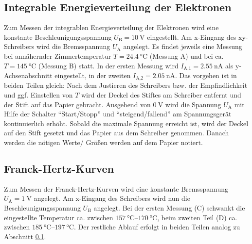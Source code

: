 \subsection{Integrable Energieverteilung der Elektronen}
\label{sec:enegieverteilung}
Zum Messen der integrablen Energieverteilung der Elektronen wird eine konstante Beschleunigungsspannung $U_\text{B} = \qty[]{10}{\volt}$ eingestellt.
Am x-Eingang des xy-Schreibers wird die Bremsspannung $U_\text{A}$ angelegt.
Es findet jeweils eine Messung bei annähernder Zimmertemperatur $T = \qty[]{24.4}{\celsius}$ (Messung A) und bei ca. $T = \qty[]{145}{\celsius}$ (Messung B) statt.
In der ersten Messung wird $I_\text{A,1} = \qty[]{2.55}{\nano\ampere}$ als y-Achsenabschnitt eingestellt, in der zweiten $I_\text{A,2} = \qty[]{2.05}{\nano\ampere}$.
Das vorgehen ist in beiden Teilen gleich: 
Nach dem Justieren des Schreibers bzw. der Empfindlichkeit und ggf. Einstellen von $T$ wird der Deckel des Stiftes am Schreiber entfernt 
und der Stift auf das Papier gebracht.
Ausgehend von $\qty[]{0}{\volt}$ wird die Spannung $U_\text{A}$ mit Hilfe der Schalter \enquote{Start/Stopp} und \enquote{steigend/fallend} 
am Spannungsgerät kontinuierlich erhöht.
Sobald die maximale Spannung erreicht ist, wird der Deckel auf den Stift gesetzt und das Papier aus dem Schreiber genommen.
Danach werden die nötigen Werte/ Größen werden auf dem Papier notiert.

\subsection{Franck-Hertz-Kurven}
Zum Messen der Franck-Hertz-Kurven wird eine konstante Bremsspannung $U_\text{A} = \qty[]{1}{\volt}$ angelegt.
Am x-Eingang des Schreibers wird nun die Beschleunigungsspannung $U_\text{B}$ angelegt.
Bei der ersten Messung (C) schwankt die eingestellte Temperatur ca. zwischen $\qtyrange[]{157}{170}{\celsius}$,
beim zweiten Teil (D) ca. zwischen $\qtyrange[]{185}{197}{\celsius}$.
Der restliche Ablauf erfolgt in beiden Teilen analog zu Abschnitt \ref{sec:enegieverteilung}.